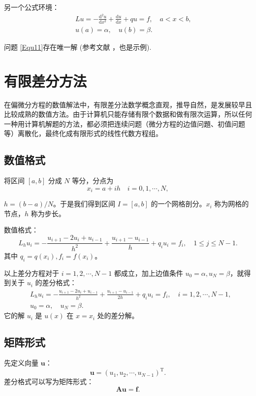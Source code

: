 \documentclass{shnuthesis}
\begin{document}
另一个公式环境：
\begin{eqnarray}\label{Equ12}
&& \displaystyle L u=-\frac{\mathrm{d}^{2} u}{\mathrm{d} x^{2}}+\frac{\mathrm{d} u}{\mathrm{d} x}+q u=f, \quad a < x < b, \\
&& \displaystyle u(a)=\alpha, \quad u(b)=\beta.
\end{eqnarray}

问题 \eqref{Equ11}存在唯一解 (参考文献 \cite{Tadmor2012}，也是示例).


\section{有限差分方法}
在偏微分方程的数值解法中，有限差分法数学概念直观，推导自然，是发展较早且比较成熟的数值方法。由于计算机只能存储有限个数据和做有限次运算，所以任何一种用计算机解题的方法，都必须把连续问题（微分方程的边值问題、初值问题等）离散化，最终化成有限形式的线性代数方程组。

\subsection{数值格式}
将区间 $[a,b]$ 分成 $N$ 等分，分点为
$$x_{i}=a+i h \quad i=0,1, \cdots, N,$$

$h=(b-a) / N$。于是我们得到区间 $I=[a,b]$ 的一个网格剖分。$x_i$ 称为网格的节点，$h$ 称为步长。

数值格式：
$$L_{h} u_{i}=-\frac{u_{i+1}-2 u_{i}+u_{i-1}}{h^{2}}+\frac{u_{i+1}-u_{i-1}}{h}+q_{i} u_{i}=f_{i},\quad 1 \leqslant j \leqslant N-1.$$
其中  $q_{i}=q(x_{i}), f_{i}=f(x_{i})$。

以上差分方程对于 $i=1,2, \cdots, N-1$ 都成立，加上边值条件 $u_{0}=\alpha, u_{N}=\beta$，就得到关于 $u_i$ 的差分格式：
$$\begin{aligned}
& L_{h} u_{i}=-\frac{u_{i+1}-2 u_{i}+u_{i-1}}{h^{2}}+\frac{u_{i+1}-u_{i-1}}{2h}+q_{i} u_{i}=f_{i}, \quad i=1,2, \cdots, N-1, \\
& u_{0}=\alpha, \quad u_{N}=\beta.
\end{aligned}$$
它的解 $u_i$ 是 $u(x)$ 在 $x=x_i$ 处的差分解。



\subsection{矩阵形式}

先定义向量 $\boldsymbol{u}$：
$$\boldsymbol{u}=(u_{1}, u_{2}, \cdots, u_{N-1})^{\mathrm{T}}.$$
差分格式可以写为矩阵形式：
$$\boldsymbol{A}\boldsymbol{u}=\boldsymbol{f}.
$$
\end{document}
